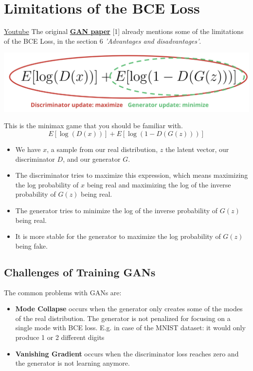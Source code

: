 \section{Limitations of the BCE Loss}
\href{https://www.youtube.com/watch?v=hlQQhQbRbTY&t=1s}{Youtube} \newline 
The original \href{https://arxiv.org/pdf/1406.2661.pdf}{\textbf{GAN paper}} [1] already mentions some of the limitations of the BCE Loss, in the section 6 \textit{'Advantages and disadvantages'}.

\includegraphics[width=1\linewidth]{img//genAdvNet//modernGAN/screen-shot-2022-06-29-at-4.13.01-pm.jpeg}

This is the minimax game that you should be familiar with. \[E[\log (D(x))] + E[\log (1 - D(G(z)))]\]

\begin{itemize}
    \item We have \(x\), a sample from our real distribution, \(z\) the latent vector, our discriminator \(D\), and our generator \(G\).
    \item The discriminator tries to maximize this expression, which means maximizing the log probability of \(x\) being real and maximizing the log of the inverse probability of \(G(z)\) being real.
    \item The generator tries to minimize the log of the inverse probability of \(G(z)\) being real.
    \item It is more stable for the generator to maximize the log probability of \(G(z)\) being fake.
\end{itemize}

\subsection{Challenges of Training GANs}
The common problems with GANs are:
\begin{itemize}
    \item \textbf{Mode Collapse} occurs when the generator only creates some of the modes of the real distribution. The generator is not penalized for focusing on a single mode with BCE loss. E.g. in case of the MNIST dataset: it would only produce 1 or 2 different digits
    \item \textbf{Vanishing Gradient} occurs when the discriminator loss reaches zero and the generator is not learning anymore.
\end{itemize}


